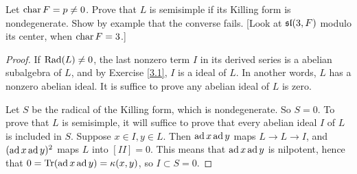 \begin{ex}
  Let $\Char F = p \neq 0$. Prove that $L$ is semisimple if its Killing form is nondegenerate. Show by example that the converse fails. [Look at $\sl(3,F)$ modulo its center, when $\Char F = 3$.]
\end{ex}
\begin{proof}
  If $\Rad(L) \neq 0$, the last nonzero term $I$ in its derived series is a abelian subalgebra of $L$, and by Exercise \ref{3.1}, $I$ is a ideal of $L$. In another words, $L$ has a nonzero abelian ideal. It is suffice to prove any abelian ideal of $L$ is zero.

  Let $S$ be the radical of the Killing form, which is nondegenerate. So $S = 0$. To prove that $L$ is semisimple, it will suffice to prove that every abelian ideal $I$ of $L$ is included in $S$. Suppose $x \in I, y \in L$. Then $\ad x\ad y$ maps $L\to L \to I$, and $(\ad x \ad y)^2$ maps $L$ into $[II] = 0$. This means that $\ad x \ad y$ is nilpotent, hence that $0 = \Tr(\ad x \ad y) = \kappa(x,y)$, so $I \subset S = 0$.
\end{proof}

